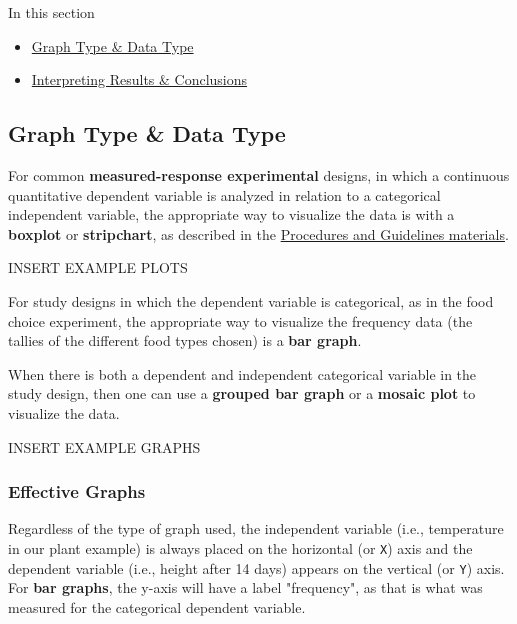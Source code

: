 \documentclass[
]{book}
\providecommand{\tightlist}{%
  \setlength{\itemsep}{0pt}\setlength{\parskip}{0pt}}
\begin{document}
In this section

\begin{itemize}
\tightlist
\item
  \protect\hyperlink{graph-type-data-type}{Graph Type \& Data Type}
\item
  \protect\hyperlink{interpreting-results-conclusions}{Interpreting Results \& Conclusions}
\end{itemize}

\hypertarget{graph-type-data-type}{%
\subsection*{Graph Type \& Data Type}\label{graph-type-data-type}}

For common \textbf{measured-response experimental} designs, in which a continuous quantitative dependent variable is analyzed in relation to a categorical independent variable, the appropriate way to visualize the data is with a \textbf{boxplot} or \textbf{stripchart}, as described in the \href{https://ubco-biology.github.io/Procedures-and-Guidelines/figures-tables.html}{Procedures and Guidelines materials}.

INSERT EXAMPLE PLOTS

For study designs in which the dependent variable is categorical, as in the food choice experiment, the appropriate way to visualize the frequency data (the tallies of the different food types chosen) is a \textbf{bar graph}.

When there is both a dependent and independent categorical variable in the study design, then one can use a \textbf{grouped bar graph} or a \textbf{mosaic plot} to visualize the data.

INSERT EXAMPLE GRAPHS

\hypertarget{effective-graphs}{%
\subsubsection*{Effective Graphs}\label{effective-graphs}}

Regardless of the type of graph used, the independent variable (i.e., temperature in our plant example) is always placed on the horizontal (or \texttt{X}) axis and the dependent variable (i.e., height after 14 days) appears on the vertical (or \texttt{Y}) axis. For \textbf{bar graphs}, the y-axis will have a label "frequency", as that is what was measured for the categorical dependent variable.
\end{document}
